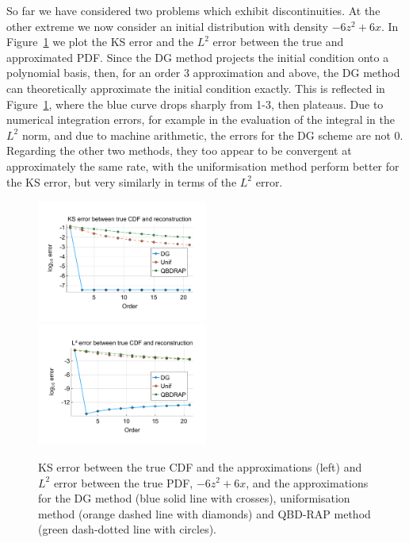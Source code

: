 \begin{example}So far we have considered two problems which exhibit discontinuities. At the other extreme we now consider an initial distribution with density \(-6z^2+6x\). In Figure~\ref{fig: fun 6 comp} we plot the KS error and the \(L^2\) error between the true and approximated PDF. Since the DG method projects the initial condition onto a polynomial basis, then, for an order 3 approximation and above, the DG method can theoretically approximate the initial condition exactly. This is reflected in Figure~\ref{fig: fun 6 comp}, where the blue curve drops sharply from 1-3, then plateaus. Due to numerical integration errors, for example in the evaluation of the integral in the \(L^2\) norm, and due to machine arithmetic, the errors for the DG scheme are not 0. Regarding the other two methods, they too appear to be convergent at approximately the same rate, with the uniformisation method perform better for the KS error, but very similarly in terms of the \(L^2\) error. 
\begin{figure}
	\centering
	\includegraphics[width=0.5\textwidth,trim={1.25cm 0.8cm 0.25cm 1.25cm},clip]{chapter6/figs/comp/fun6/meshs_ks_error_formatted.pdf}%
	\includegraphics[width=0.5\textwidth,trim={1.25cm 0.8cm 0.25cm 1.25cm},clip]{chapter6/figs/comp/fun6/meshs_l2_pdf_error_formatted.pdf}
	\caption{KS error between the true CDF and the approximations (left) and \(L^2\) error between the true PDF, \(-6z^2+6x\), and the approximations for the DG method (blue solid line with crosses), uniformisation method (orange dashed line with diamonds) and QBD-RAP method (green dash-dotted line with circles).}
	\label{fig: fun 6 comp} 
\end{figure}
\end{example}

